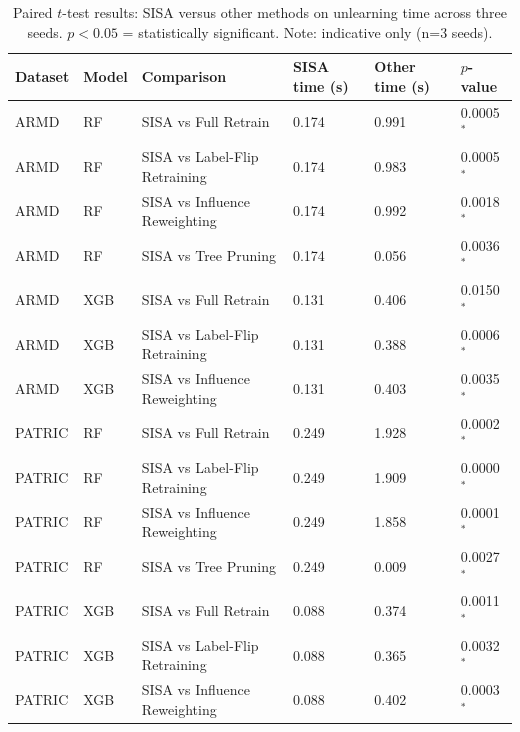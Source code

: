 \begin{table}[htbp]
\centering
\caption{Paired $t$-test results: SISA versus other methods on unlearning time across three seeds. $p < 0.05$ = statistically significant. Note: indicative only (n=3 seeds).}
\label{tab:stats}
\renewcommand{\arraystretch}{1.25}
\begin{tabular}{L{1.5cm} L{1.5cm} L{4.5cm} C{2.5cm} C{2.5cm} C{1.5cm}}
\toprule
\textbf{Dataset} & \textbf{Model} & \textbf{Comparison} & \textbf{SISA time (s)} & \textbf{Other time (s)} & \textbf{$p$-value} \\
\midrule
ARMD & RF & SISA vs Full Retrain & 0.174 & 0.991 & 0.0005 $^*$ \\
ARMD & RF & SISA vs Label-Flip Retraining & 0.174 & 0.983 & 0.0005 $^*$ \\
ARMD & RF & SISA vs Influence Reweighting & 0.174 & 0.992 & 0.0018 $^*$ \\
ARMD & RF & SISA vs Tree Pruning & 0.174 & 0.056 & 0.0036 $^*$ \\
ARMD & XGB & SISA vs Full Retrain & 0.131 & 0.406 & 0.0150 $^*$ \\
ARMD & XGB & SISA vs Label-Flip Retraining & 0.131 & 0.388 & 0.0006 $^*$ \\
ARMD & XGB & SISA vs Influence Reweighting & 0.131 & 0.403 & 0.0035 $^*$ \\
PATRIC & RF & SISA vs Full Retrain & 0.249 & 1.928 & 0.0002 $^*$ \\
PATRIC & RF & SISA vs Label-Flip Retraining & 0.249 & 1.909 & 0.0000 $^*$ \\
PATRIC & RF & SISA vs Influence Reweighting & 0.249 & 1.858 & 0.0001 $^*$ \\
PATRIC & RF & SISA vs Tree Pruning & 0.249 & 0.009 & 0.0027 $^*$ \\
PATRIC & XGB & SISA vs Full Retrain & 0.088 & 0.374 & 0.0011 $^*$ \\
PATRIC & XGB & SISA vs Label-Flip Retraining & 0.088 & 0.365 & 0.0032 $^*$ \\
PATRIC & XGB & SISA vs Influence Reweighting & 0.088 & 0.402 & 0.0003 $^*$ \\
\bottomrule
\end{tabular}
\end{table}